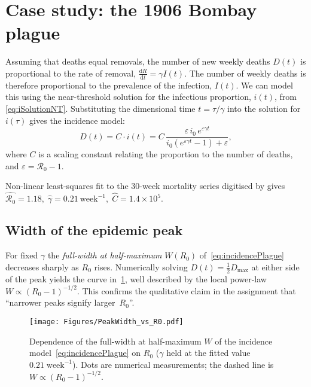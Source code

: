 \documentclass[11pt]{article}
\newcommand{\RR}{\mathcal{R}_0}
\begin{document}
\section{Case study: the 1906 Bombay plague}\label{sec:PlagueFit}

Assuming that deaths equal removals, the number of new weekly deaths $D(t)$ is
proportional to the rate of removal, $\frac{\mathrm{d}R}{\mathrm{d}t} = \gamma I(t)$.
The number of weekly deaths is therefore proportional to the prevalence of the
infection, $I(t)$. We can model this using the near-threshold solution for the
infectious proportion, $i(t)$, from \cref{eq:iSolutionNT}. Substituting the
dimensional time $t=\tau/\gamma$ into the solution for $i(\tau)$ gives the
incidence model:
\begin{equation}\label{eq:incidencePlague}
  D(t) = C \cdot i(t) = C\,
    \frac{\varepsilon\,i_0\,e^{\varepsilon\gamma t}}
         {i_0(e^{\varepsilon\gamma t}-1)+\varepsilon},
\end{equation}
where $C$ is a scaling constant relating the proportion to the number of deaths,
and $\varepsilon = \RR-1$.

Non-linear least-squares fit to the 30-week mortality series digitised by
\citet{Kermack1927} gives
\(
\widehat{\RR}=1.18,\; %
\widehat{\gamma}=0.21\ \text{week}^{-1},\; %
\widehat{C}=1.4\times10^{5}. %
\)
\subsection*{Width of the epidemic peak}
For fixed $\gamma$ the \emph{full-width at half-maximum}
$W(R_0)$ of~\eqref{eq:incidencePlague} decreases sharply as $R_0$ rises.
Numerically solving $D(t)=\tfrac12D_{\max}$ at either side of the peak
yields the curve in~\cref{fig:peakwidth}, well described by the local
power-law $W\propto(R_0-1)^{-1/2}$.  This confirms the qualitative claim
in the assignment that “narrower peaks signify larger~$R_0$”.

\begin{figure}[H]
  \centering
  \texttt{[image: Figures/PeakWidth\_vs\_R0.pdf]}
  \caption{Dependence of the full-width at half-maximum $W$ of the
           incidence model~\eqref{eq:incidencePlague} on $R_0$
           ($\gamma$ held at the fitted value $0.21\;\text{week}^{-1}$).
           Dots are numerical measurements; the dashed line is
           $W\propto(R_0-1)^{-1/2}$.}
  \label{fig:peakwidth}
\end{figure}
\end{document}
